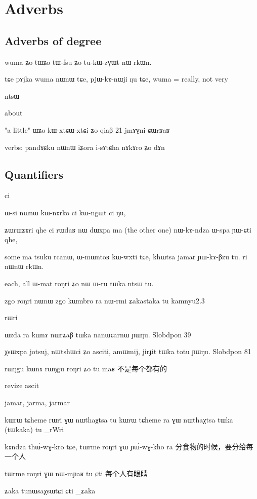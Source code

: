\documentclass[oldfontcommands,oneside,a4paper,11pt]{memoir}
\newcommand{\ipa}[1]{{\phon #1}} %
\begin{document}
\chapter{Adverbs} \label{chapt:adv}
\section{Adverbs of degree} \label{adv:degree}
wuma ʑo tɯʑo tɯ-fsu ʑo tu-kɯ-zɣɯt nɯ rkɯn.

tɕe pɤjka wuma nɯnɯ tɕe, pjɯ-kɤ-nɯji ŋu tɕe,
wuma = really, not very

ntsɯ


about

"a little"
ɯʑo kɯ-xtɕɯ-xtɕi ʑo qiaβ
21  jmɤɣni ɕɯrʁaʁ

verbs:
pandɤɕku nɯnɯ iʑora i-sɤtɕha nɤkɤro ʑo dɤn 

\section{Quantifiers}
ci

ɯ-si nɯnɯ kɯ-nɤrko ci kɯ-ngɯt ci ŋu,

ʑɯrɯʑɤri qhe ci rɯdaʁ nɯ dɯxpa ma (the other one)
nɯ-kɤ-ndza ɯ-spa ɲɯ-ɕti qhe,

some
ma tsuku rcanɯ, ɯ-mɯntoʁ kɯ-wxti tɕe, khɯtsa jamar ɲɯ-kɤ-βzu tu.
ri nɯnɯ rkɯn.


each, all
ɯ-mat roŋri ʑo nɯ ɯ-ru tɯka ntsɯ tu.

zgo roŋri nɯnɯ zgo kɯmbro ra nɯ-rmi ʑakastaka tu
kamnyu2.3

rɯri

ɯzda ra kɯnɤ nɯrʑaβ tɯka nanɯɕarnɯ ɲɯŋu.
Slobdpon 39

χsɯxpa jotsuj, nɯtshɯci ʑo asciti, amɯmij, jirɟit tɯka totu ɲɯŋu.
Slobdpon 81

rɯŋgu kɯnɤ rɯŋgu roŋri ʑo tu maʁ
不是每个都有的

revize ascit


\ipa{jamar}, \ipa{jarma}, \ipa{jarmar}





kɯrɯ tɕheme rɯri ɣɯ nɯthaχtsa tu
kɯrɯ tɕheme ra ɣɯ nɯthaχtsa tɯka (tɯkaka) tu
\ipa{8_rWri}

\xv kɤndza thɯ́-wɣ-kro tɕe, tɯrme roŋri ɣɯ ɲɯ́-wɣ-kho ra
\xn 分食物的时候，要分给每一个人

\xv tɯrme roŋri ɣɯ nɯ-mɲaʁ tu ɕti
\xn 每个人有眼睛

\xv ʑaka tunɯsaχsɯtɕi ɕti
\ipa{8_ʑaka}
\end{document}
